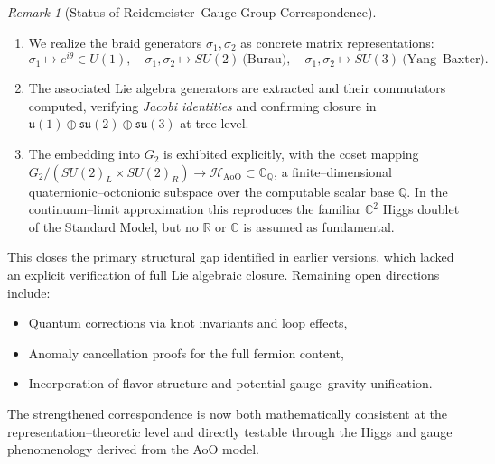\documentclass[12pt]{article}
\theoremstyle{remark}
\newtheorem*{remark}{Remark}
\begin{document}
\begin{remark}[Status of Reidemeister–Gauge Group Correspondence]
\begin{enumerate}
\item We realize the braid generators $\sigma_1, \sigma_2$ as concrete matrix representations:
\[
\sigma_1 \mapsto e^{i\theta} \in U(1), \quad
\sigma_1,\sigma_2 \mapsto SU(2)\ \text{(Burau)}, \quad
\sigma_1,\sigma_2 \mapsto SU(3)\ \text{(Yang--Baxter)}.
\]
\item The associated Lie algebra generators are extracted and their commutators computed, 
verifying \emph{Jacobi identities} and confirming closure in
\(
\mathfrak{u}(1) \oplus \mathfrak{su}(2) \oplus \mathfrak{su}(3)
\)
at tree level.
\item The embedding into $G_2$ is exhibited explicitly, with the coset mapping 
$G_2/(SU(2)_L\times SU(2)_R) \to \mathcal{H}_{\mathrm{AoO}} \subset \mathbb{O}_{\mathbb{Q}}$, 
a finite–dimensional quaternionic–octonionic subspace over the computable scalar base $\mathbb{Q}$.  
In the continuum–limit approximation this reproduces the familiar $\mathbb{C}^2$ Higgs doublet of the Standard Model,  
but no $\mathbb{R}$ or $\mathbb{C}$ is assumed as fundamental.
\end{enumerate}

This closes the primary structural gap identified in earlier versions, which lacked an explicit verification 
of full Lie algebraic closure. Remaining open directions include:
\begin{itemize}
\item Quantum corrections via knot invariants and loop effects,
\item Anomaly cancellation proofs for the full fermion content,
\item Incorporation of flavor structure and potential gauge–gravity unification.
\end{itemize}

The strengthened correspondence is now both mathematically consistent at the representation–theoretic 
level and directly testable through the Higgs and gauge phenomenology derived from the AoO model.
\end{remark}
\end{document}
